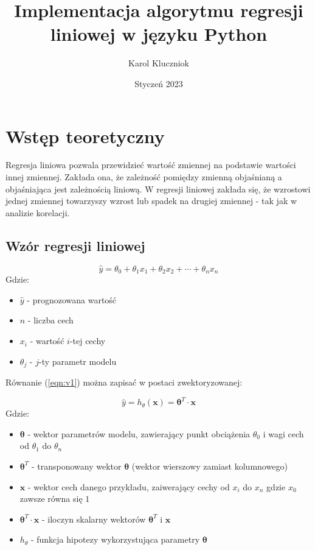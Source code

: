 \documentclass{article}
\title{Implementacja algorytmu regresji liniowej w języku Python}
\author{Karol Kluczniok}
\date{Styczeń 2023}
\begin{document}
\maketitle


\let\oldref\ref
\renewcommand{\ref}[1]{(\oldref{#1})}


\section{Wstęp teoretyczny}

Regresja liniowa pozwala przewidzieć wartość zmiennej na podstawie wartości innej zmiennej. Zakłada ona, że zależność pomiędzy zmienną objaśnianą a objaśniająca jest zależnością liniową. W regresji liniowej zakłada się, że wzrostowi jednej zmiennej towarzyszy wzrost lub spadek na drugiej zmiennej - tak jak w analizie korelacji.

\subsection{Wzór regresji liniowej}
\begin{equation}
    \hat{y} = \theta_0 + \theta_1 x_1 + \theta_2 x _2 + \cdots + \theta_n x_n
\end{equation}
Gdzie:
\begin{itemize}
    \item $\hat{y}$ - prognozowana wartość
    \item $n$ - liczba cech
    \item $x_i$ - wartość $i$-tej cechy
    \item $\theta_j$ - $j$-ty parametr modelu
    \label{eqn:v1}
\end{itemize}

\noindent Równanie \ref{eqn:v1} można zapisać w postaci zwektoryzowanej:

\begin{equation}
    \hat{y} = h_\theta(\bm{x})=\bm{\theta}^T\cdot\bm{x}
\end{equation}
Gdzie:
\begin{itemize}
    \item $\bm{\theta}$ - wektor parametrów modelu, zawierający punkt obciążenia $\theta_0$ i wagi cech od $\theta_1$ do $\theta_n$
    \item $\bm{\theta}^T$ - transponowany wektor $\bm{\theta}$ (wektor wierszowy zamiast kolumnowego)
    \item $\bm{x}$ - wektor cech danego przykładu, zaiwerający cechy od $x_i$ do $x_n$ gdzie $x_0$ zawsze równa się $1$
    \item $\bm{\theta}^T \cdot \bm{x}$ - iloczyn skalarny wektorów $\bm{\theta}^T$ i $\bm{x}$
    \item $h_\theta$ - funkcja hipotezy wykorzystująca parametry $\bm{\theta}$
\end{itemize}
\end{document}
